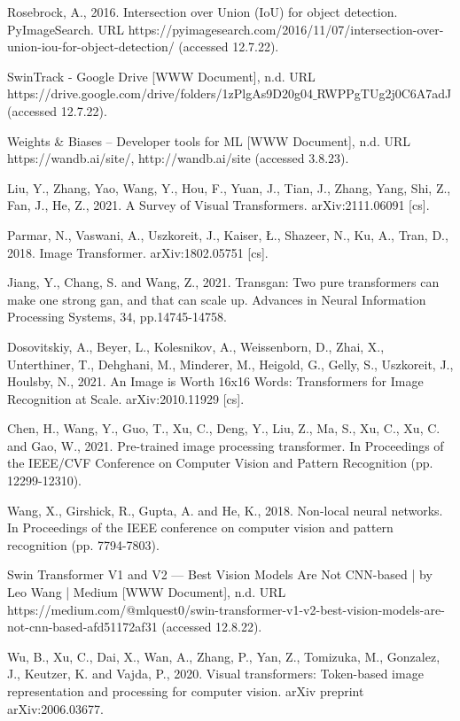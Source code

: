 \begin{thebibliography}{ widest-label }
	Rosebrock, A., 2016. Intersection over Union (IoU) for object detection. PyImageSearch. URL https://pyimagesearch.com/2016/11/07/intersection-over-union-iou-for-object-detection/ (accessed 12.7.22).
	
	SwinTrack - Google Drive [WWW Document], n.d. URL https://drive.google.com/drive/folders/1zPlgAs9D20g04$\_$RWPPgTUg2j0C6A7adJ (accessed 12.7.22).
	
Weights \& Biases – Developer tools for ML [WWW Document], n.d. URL https://wandb.ai/site/, http://wandb.ai/site (accessed 3.8.23).

	
	Liu, Y., Zhang, Yao, Wang, Y., Hou, F., Yuan, J., Tian, J., Zhang, Yang, Shi, Z., Fan, J., He, Z., 2021. A Survey of Visual Transformers. arXiv:2111.06091 [cs].
	
	Parmar, N., Vaswani, A., Uszkoreit, J., Kaiser, Ł., Shazeer, N., Ku, A., Tran, D., 2018. Image Transformer. arXiv:1802.05751 [cs].
	
	Jiang, Y., Chang, S. and Wang, Z., 2021. Transgan: Two pure transformers can make one strong gan, and that can scale up. Advances in Neural Information Processing Systems, 34, pp.14745-14758.
	
	Dosovitskiy, A., Beyer, L., Kolesnikov, A., Weissenborn, D., Zhai, X., Unterthiner, T., Dehghani, M., Minderer, M., Heigold, G., Gelly, S., Uszkoreit, J., Houlsby, N., 2021. An Image is Worth 16x16 Words: Transformers for Image Recognition at Scale. arXiv:2010.11929 [cs].
	
	Chen, H., Wang, Y., Guo, T., Xu, C., Deng, Y., Liu, Z., Ma, S., Xu, C., Xu, C. and Gao, W., 2021. Pre-trained image processing transformer. In Proceedings of the IEEE/CVF Conference on Computer Vision and Pattern Recognition (pp. 12299-12310).
	
	Wang, X., Girshick, R., Gupta, A. and He, K., 2018. Non-local neural networks. In Proceedings of the IEEE conference on computer vision and pattern recognition (pp. 7794-7803).
	
	Swin Transformer V1 and V2 — Best Vision Models Are Not CNN-based | by Leo Wang | Medium [WWW Document], n.d. URL https://medium.com/@mlquest0/swin-transformer-v1-v2-best-vision-models-are-not-cnn-based-afd51172af31 (accessed 12.8.22).
	
	Wu, B., Xu, C., Dai, X., Wan, A., Zhang, P., Yan, Z., Tomizuka, M., Gonzalez, J., Keutzer, K. and Vajda, P., 2020. Visual transformers: Token-based image representation and processing for computer vision. arXiv preprint arXiv:2006.03677.
	

\end{thebibliography}
